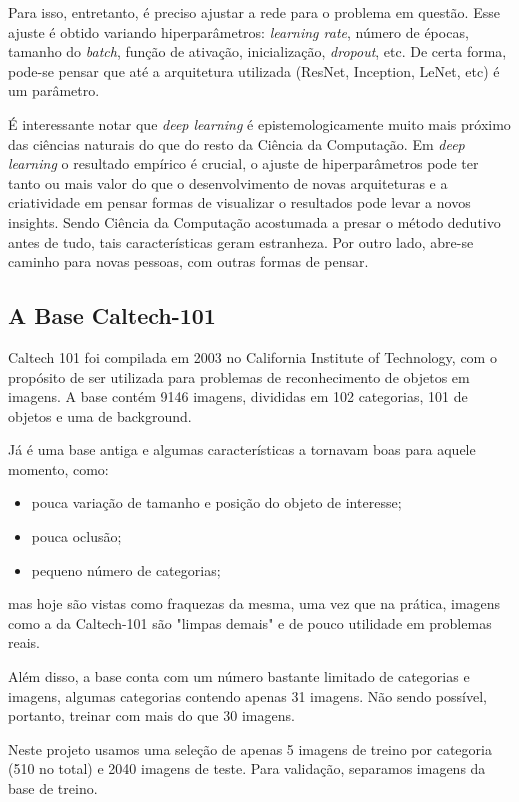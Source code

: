 \documentclass[conference]{IEEEtran}
\begin{document}
Para isso, entretanto, é preciso ajustar a rede para o problema em questão. Esse ajuste é obtido variando hiperparâmetros: \textit{learning rate}, número de épocas, tamanho do \textit{batch}, função de ativação, inicialização, \textit{dropout}, etc. De certa forma, pode-se pensar que até a arquitetura utilizada (ResNet, Inception, LeNet, etc) é um parâmetro.  

É interessante notar que \textit{deep learning} é epistemologicamente muito mais próximo das ciências naturais do que do resto da Ciência da Computação.  Em \textit{deep learning} o resultado empírico é crucial, o ajuste de hiperparâmetros pode ter tanto ou mais valor do que o desenvolvimento de novas arquiteturas e a criatividade em pensar formas de visualizar o resultados pode levar a novos insights. Sendo Ciência da Computação acostumada a presar o método dedutivo antes de tudo, tais características geram estranheza.  Por outro lado, abre-se caminho para novas pessoas, com outras formas de pensar.

\subsection{A Base Caltech-101}
Caltech 101 foi compilada em 2003 no California Institute of Technology\cite{caltech101}, com o propósito de ser utilizada para problemas de reconhecimento de objetos em imagens. A base contém 9146 imagens, divididas em 102 categorias, 101 de objetos e uma de background. 

Já é uma base antiga e algumas características a tornavam boas para aquele momento, como:

\begin{itemize}
\item pouca variação de tamanho e posição do objeto de interesse;
\item pouca oclusão;
\item pequeno número de categorias;
\end{itemize}

mas hoje são vistas como fraquezas da mesma, uma vez que na prática, imagens como a da Caltech-101 são "limpas demais" e de pouco utilidade em problemas reais.

Além disso, a base conta com um número bastante limitado de categorias e imagens, algumas categorias contendo apenas 31 imagens. Não sendo possível, portanto,  treinar com mais do que 30 imagens.

Neste projeto usamos uma seleção de apenas 5 imagens de treino por categoria (510 no total) e 2040 imagens de teste. Para validação, separamos imagens da base de treino.
\end{document}

